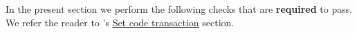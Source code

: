In the present section we perform the following checks that are \textbf{required} to pass.
We refer the reader to \cite{EIP-7702}'s
\href{https://eips.ethereum.org/EIPS/eip-7702#set-code-transaction}{Set code transaction}
section.
